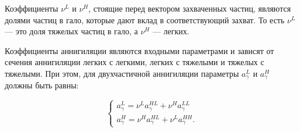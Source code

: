 Коэффициенты $\nu^L$ и $\nu^H$, стоящие перед вектором захваченных частиц, являются долями частиц в гало, которые дают вклад в соответствующий захват. То есть $\nu^L$ --- это доля тяжелых частиц в гало, а $\nu^H$ --- легких. 

Коэффициенты аннигиляции являются входными параметрами и зависят от сечения аннигиляции легких с легкими, легких с тяжелыми и тяжелых с тяжелыми. При этом, для двухчастичной аннигиляции параметры $a_{\gamma}^{L}$ и $a_{\gamma}^{H}$ должны быть равны:

\begin{equation}
	\label{eq:require_a_gamma}
	\begin{cases}
		a_{\gamma}^{L} = \nu^L a_{\gamma}^{HL} + \nu^H a_{\gamma}^{LL}\\
		a_{\gamma}^{H} = \nu^H a_{\gamma}^{HL} + \nu^L a_{\gamma}^{HH}.
	\end{cases}
\end{equation}